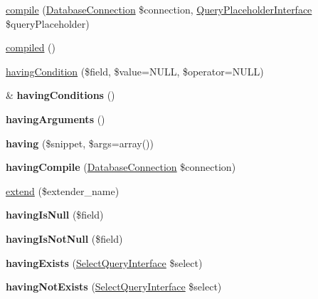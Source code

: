 \begin{DoxyCompactItemize}
\item 
\hyperlink{classSelectQuery_ad858d64a89ca6b8d60f135470d40319f}{compile} (\hyperlink{classDatabaseConnection}{DatabaseConnection} \$connection, \hyperlink{interfaceQueryPlaceholderInterface}{QueryPlaceholderInterface} \$queryPlaceholder)
\item 
\hyperlink{classSelectQuery_adc1283f0d5b5f20ed7a69bf8bee7e935}{compiled} ()
\item 
\hyperlink{classSelectQuery_a99fb631e9ddd64677d84c9e60855a6f7}{havingCondition} (\$field, \$value=NULL, \$operator=NULL)
\item 
\hypertarget{classSelectQuery_ae36c18ede223864df43dfcf5afbbc74b}{
\& {\bfseries havingConditions} ()}
\label{classSelectQuery_ae36c18ede223864df43dfcf5afbbc74b}

\item 
\hypertarget{classSelectQuery_a0f6057130103068335792005cc3d5673}{
{\bfseries havingArguments} ()}
\label{classSelectQuery_a0f6057130103068335792005cc3d5673}

\item 
\hypertarget{classSelectQuery_ad23bf64681da19c93af98e2610d06ccc}{
{\bfseries having} (\$snippet, \$args=array())}
\label{classSelectQuery_ad23bf64681da19c93af98e2610d06ccc}

\item 
\hypertarget{classSelectQuery_a89f27c396bacc44ae6dbd7ba78ac52bc}{
{\bfseries havingCompile} (\hyperlink{classDatabaseConnection}{DatabaseConnection} \$connection)}
\label{classSelectQuery_a89f27c396bacc44ae6dbd7ba78ac52bc}

\item 
\hyperlink{classSelectQuery_ab401a1ee7ce9ea726cf3856297a46532}{extend} (\$extender\_\-name)
\item 
\hypertarget{classSelectQuery_a6eef8e0334a321516ba2b9ab16a5f5a9}{
{\bfseries havingIsNull} (\$field)}
\label{classSelectQuery_a6eef8e0334a321516ba2b9ab16a5f5a9}

\item 
\hypertarget{classSelectQuery_a16172ad8aa9f0349137366e4f4f4a542}{
{\bfseries havingIsNotNull} (\$field)}
\label{classSelectQuery_a16172ad8aa9f0349137366e4f4f4a542}

\item 
\hypertarget{classSelectQuery_aa85f5a83e1a047b663657299d51a86ec}{
{\bfseries havingExists} (\hyperlink{interfaceSelectQueryInterface}{SelectQueryInterface} \$select)}
\label{classSelectQuery_aa85f5a83e1a047b663657299d51a86ec}

\item 
\hypertarget{classSelectQuery_a5753ab708f923d4e02f808c604e89e9f}{
{\bfseries havingNotExists} (\hyperlink{interfaceSelectQueryInterface}{SelectQueryInterface} \$select)}
\label{classSelectQuery_a5753ab708f923d4e02f808c604e89e9f}


\end{DoxyCompactItemize}
